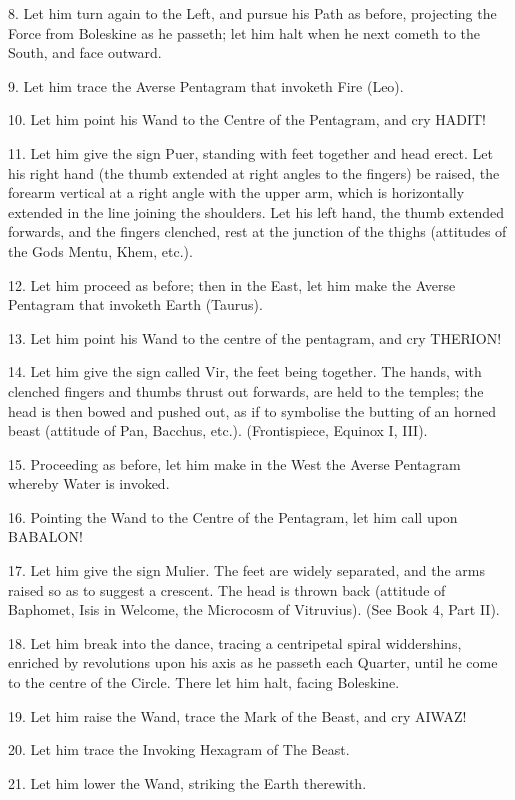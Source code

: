 8. Let him turn again to the Left, and pursue his Path as before, projecting the Force from Boleskine as he passeth; let him halt when he next cometh to the South, and face outward.

9. Let him trace the Averse Pentagram that invoketh Fire (Leo).

10. Let him point his Wand to the Centre of the Pentagram, and cry HADIT!

11. Let him give the sign Puer, standing with feet together and head erect. Let his right hand (the thumb extended at right angles to the fingers) be raised, the forearm vertical at a right angle with the upper arm, which is horizontally extended in the line joining the shoulders. Let his left hand, the thumb extended forwards, and the fingers clenched, rest at the junction of the thighs (attitudes of the Gods Mentu, Khem, etc.).

12. Let him proceed as before; then in the East, let him make the Averse Pentagram that invoketh Earth (Taurus).

13. Let him point his Wand to the centre of the pentagram, and cry THERION!

14. Let him give the sign called Vir, the feet being together. The hands, with clenched fingers and thumbs thrust out forwards, are held to the temples; the head is then bowed and pushed out, as if to symbolise the butting of an horned beast (attitude of Pan, Bacchus, etc.). (Frontispiece, Equinox I, III).

15. Proceeding as before, let him make in the West the Averse Pentagram whereby Water is invoked.

16. Pointing the Wand to the Centre of the Pentagram, let him call upon BABALON!

17. Let him give the sign Mulier. The feet are widely separated, and the arms raised so as to suggest a crescent. The head is thrown back (attitude of Baphomet, Isis in Welcome, the Microcosm of Vitruvius). (See Book 4, Part II).

18. Let him break into the dance, tracing a centripetal spiral widdershins, enriched by revolutions upon his axis as he passeth each Quarter, until he come to the centre of the Circle. There let him halt, facing Boleskine.

19. Let him raise the Wand, trace the Mark of the Beast, and cry AIWAZ!

20. Let him trace the Invoking Hexagram of The Beast.

21. Let him lower the Wand, striking the Earth therewith.

